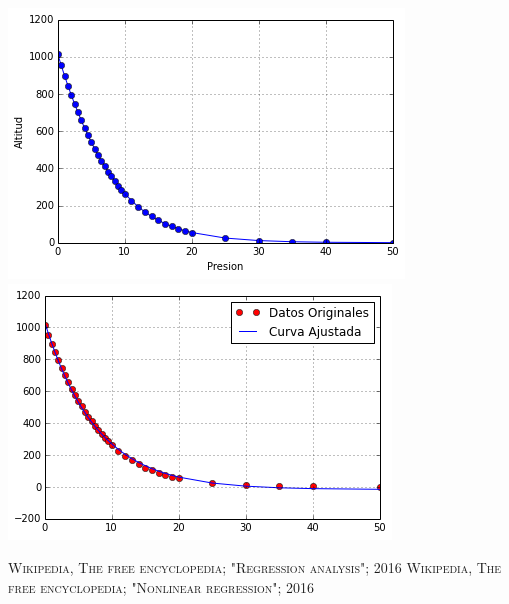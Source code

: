 \documentclass[12pt]{article}
\begin{document}
\begin{center}
\includegraphics{4b.png}
\includegraphics{4bb.png}
\end{center}
\pagebreak


\pagebreak

\begin{thebibliography}{X}
  \textsc{Wikipedia, The free encyclopedia; "Regression analysis"; 2016}
  \textsc{Wikipedia, The free encyclopedia; "Nonlinear regression"; 2016}
 
\end{thebibliography}
\end{document}

